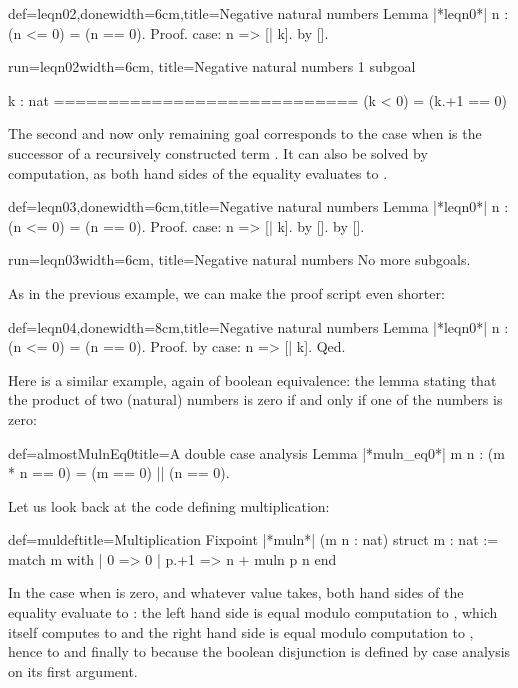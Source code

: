 \begin{coq}{def=leqn02,done}{width=6cm,title=Negative natural numbers}
Lemma |*leqn0*| n : (n <= 0) = (n == 0).
Proof.
case: n => [| k].
  by [].
\end{coq}
\begin{coqout}{run=leqn02}{width=6cm, title=Negative natural numbers}
1 subgoal

  k : nat
  ============================
   (k < 0) = (k.+1 == 0)
\end{coqout}
The second and now only remaining goal corresponds to the case when
 is the successor  of a recursively constructed term
.
It can also be  solved by computation, as both hand sides
of the equality evaluates to .

\begin{coq}{def=leqn03,done}{width=6cm,title=Negative natural numbers}
Lemma |*leqn0*| n : (n <= 0) = (n == 0).
Proof.
case: n => [| k].
  by [].
by [].
\end{coq}
\begin{coqout}{run=leqn03}{width=6cm, title=Negative natural numbers}
  No more subgoals.
\end{coqout}
As in the previous example, we can make the proof script even shorter:

\begin{coq}{def=leqn04,done}{width=8cm,title=Negative natural numbers}
Lemma |*leqn0*| n : (n <= 0) = (n == 0).
Proof.
by case: n => [| k].
Qed.
\end{coq}

Here is a similar example, again of boolean equivalence: the lemma
stating that the product of two (natural) numbers is zero if and only
if one of the numbers is zero:

\begin{coq}{def=almostMulnEq0}{title=A double case analysis}
Lemma |*muln_eq0*| m n : (m * n == 0) = (m == 0) || (n == 0).
\end{coq}

Let us look back at the code defining multiplication:

\begin{coq}{def=muldef}{title=Multiplication}
Fixpoint |*muln*| (m n : nat) {struct m} : nat :=
  match m with
  | 0 => 0
  | p.+1 => n + muln p n
  end
\end{coq}
In the case when  is zero, and whatever value  takes, both
hand sides of the equality evaluate to : the left hand side is
equal modulo computation to , which itself computes to
 and the right hand side is equal modulo computation to
, hence to  and finally to
 because the boolean disjunction \C{(_ || _)} is defined by
case analysis on its first argument.

